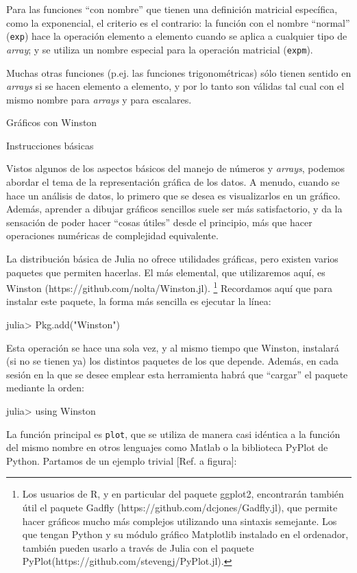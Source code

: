 ﻿\documentclass{article}
\newcommand{\code}{\texttt}
\begin{document}
Para las funciones ``con nombre'' que tienen una definición matricial específica, como la exponencial, el criterio es el contrario: la función con el nombre ``normal'' (\code{exp}) hace la operación elemento a elemento cuando se aplica a cualquier tipo de \emph{array}; y se utiliza un nombre especial para la operación matricial (\code{expm}).

Muchas otras funciones (p.ej. las funciones trigonométricas) sólo tienen sentido en \emph{arrays} si se hacen elemento a elemento, y por lo tanto son válidas tal cual con el mismo nombre para \emph{arrays} y para escalares.




Gráficos con Winston

Instrucciones básicas

Vistos algunos de los aspectos básicos del manejo de números y \emph{arrays}, podemos abordar el tema de la representación gráfica de los datos. A menudo, cuando se hace un análisis de datos, lo primero que se desea es visualizarlos en un gráfico. Además, aprender a dibujar gráficos sencillos suele ser más satisfactorio, y da la sensación de poder hacer ``cosas útiles'' desde el principio, más que hacer operaciones numéricas de complejidad equivalente.

La distribución básica de Julia no ofrece utilidades gráficas, pero existen varios paquetes que permiten hacerlas. El más elemental, que utilizaremos aquí, es Winston (https://github.com/nolta/Winston.jl).%
\footnote{%
Los usuarios de R, y en particular del paquete ggplot2, encontrarán también útil el paquete Gadfly (https://github.com/dcjones/Gadfly.jl), que permite hacer gráficos mucho más complejos utilizando una sintaxis semejante. Los que tengan Python y su módulo gráfico Matplotlib instalado en el ordenador, también pueden usarlo a través de Julia con el paquete PyPlot(https://github.com/stevengj/PyPlot.jl).}%
Recordamos aquí que para instalar este paquete, la forma más sencilla es ejecutar la línea:

julia> Pkg.add("Winston")

Esta operación se hace una sola vez, y al mismo tiempo que Winston, instalará (si no se tienen ya) los distintos paquetes de los que depende. Además, en cada sesión en la que se desee emplear esta herramienta habrá que ``cargar'' el paquete mediante la orden:

julia> using Winston

La función principal es \code{plot}, que se utiliza de manera casi idéntica a la función del mismo nombre en otros lenguajes como Matlab o la biblioteca PyPlot de Python. Partamos de un ejemplo trivial [Ref. a figura]:
\end{document}
